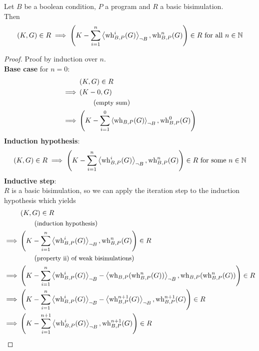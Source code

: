 \begin{lemma}[label=lem:bisim:iteration]
	Let $B$ be a boolean condition, $P$ a program and $R$ a basic bisimulation. \\
	Then \[ \pair{K, G} \in R
		\implies \pair{K - \sum_{i = 1}^{n} \resN{\wh^i(G)}, \wh^n(G)}
		\in R \text{ for all } n \in \N \]
	\begin{proof}
		Proof by induction over $n$. \\
		\textbf{Base case} for $n = 0$:
		\begin{align*}
					 & \pair{K, G} \in R \\
			\implies & \pair{K - 0, G} \\
					 & \explain{empty sum} \\
			\implies & \pair{K - \sum_{i = 1}^{0} \resN{\wh(G)}, \wh^0(G)}
		\end{align*}
		\textbf{Induction hypothesis}:
		 \[ \pair{K, G} \in R \implies
			\pair{K - \sum_{i = 1}^{n} \resN{\wh^i(G)}, \wh^{n}(G)} \in R
			\text{ for some } n \in \N \]
		\textbf{Inductive step}: \\
		$R$ is a basic bisimulation, so we can apply the iteration step to the induction hypothesis which yields
		\begin{align*}
				 & \pair{K, G} \in R \\
				 & \explain{induction hypothesis} \\
		\implies & \pair{K - \sum_{i = 1}^{n} \resN{\wh^i(G)}, \wh^{n}(G)} \in R \\
				 & \explain{property ii) of weak bisimulations} \\
		\implies & \pair{K - \sum_{i = 1}^{n} \resN{\wh^i(G)} - \resN{\wh(\wh^n(G))}
			, \wh(\wh^{n}(G))} \in R \\
		\implies & \pair{K - \sum_{i = 1}^{n} \resN{\wh^i(G)} - \resN{\wh^{n+1}(G)}
			, \wh^{n+1}(G)} \in R \\
		\implies & \pair{K - \sum_{i = 1}^{n+1} \resN{\wh^i(G)}
			, \wh^{n+1}(G)} \in R
		\end{align*}
	\end{proof}
\end{lemma}

